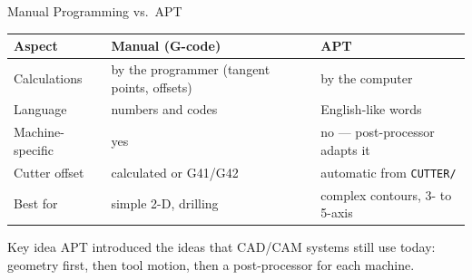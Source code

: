 \documentclass[aspectratio=169]{beamer}
\begin{document}
	\begin{frame}{Manual Programming vs.\ APT}
		\renewcommand{\arraystretch}{1.3}
		\centering
		\small
		\begin{tabular}{@{}>{\raggedright}p{3.0cm}>{\raggedright}p{4.6cm}>{\raggedright\arraybackslash}p{4.6cm}@{}}
			\toprule
			\textbf{Aspect} & \textbf{Manual (G-code)} & \textbf{APT} \\
			\midrule
			Calculations    & by the programmer (tangent points, offsets) & by the computer \\
			Language        & numbers and codes          & English-like words \\
			Machine-specific & yes                       & no --- post-processor adapts it \\
			Cutter offset   & calculated or G41/G42      & automatic from \texttt{CUTTER/} \\
			Best for        & simple 2-D, drilling       & complex contours, 3- to 5-axis \\
			\bottomrule
		\end{tabular}
		\vspace{0.3cm}
		\begin{block}{Key idea}
			\small APT introduced the ideas that CAD/CAM systems still use today: geometry first, then tool motion, then a post-processor for each machine.
		\end{block}
	\end{frame}

\end{document}

